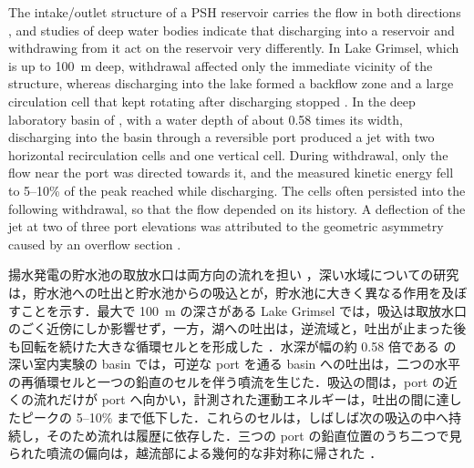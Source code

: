 \begin{en}[I-4]
The intake/outlet structure of a PSH reservoir carries the flow in both directions \citep{zhangParameterAnalysisPerformance2020,bermudezHydraulicModelStudy2017,mullerFlowFieldReservoir2018}, and studies of deep water bodies indicate that discharging into a reservoir and withdrawing from it act on the reservoir very differently. In Lake Grimsel, which is up to 100~m deep, withdrawal affected only the immediate vicinity of the structure, whereas discharging into the lake formed a backflow zone and a large circulation cell that kept rotating after discharging stopped \citep{mullerFlowFieldReservoir2018}. In the deep laboratory basin of \citet{mullerInfluenceOutflowSequences2012}, with a water depth of about 0.58 times its width, discharging into the basin through a reversible port produced a jet with two horizontal recirculation cells and one vertical cell. During withdrawal, only the flow near the port was directed towards it, and the measured kinetic energy fell to 5--10\% of the peak reached while discharging. The cells often persisted into the following withdrawal, so that the flow depended on its history. A deflection of the jet at two of three port elevations was attributed to the geometric asymmetry caused by an overflow section \citep{mullerInfluenceOutflowSequences2012}.
\end{en}
\begin{ja}
揚水発電の貯水池の取放水口は両方向の流れを担い \citep{zhangParameterAnalysisPerformance2020,bermudezHydraulicModelStudy2017,mullerFlowFieldReservoir2018}，深い水域についての研究は，貯水池への吐出と貯水池からの吸込とが，貯水池に大きく異なる作用を及ぼすことを示す．最大で 100~m の深さがある Lake Grimsel では，吸込は取放水口のごく近傍にしか影響せず，一方，湖への吐出は，逆流域と，吐出が止まった後も回転を続けた大きな循環セルとを形成した \citep{mullerFlowFieldReservoir2018}．水深が幅の約 0.58 倍である \citet{mullerInfluenceOutflowSequences2012} の深い室内実験の basin では，可逆な port を通る basin への吐出は，二つの水平の再循環セルと一つの鉛直のセルを伴う噴流を生じた．吸込の間は，port の近くの流れだけが port へ向かい，計測された運動エネルギーは，吐出の間に達したピークの 5--10\% まで低下した．これらのセルは，しばしば次の吸込の中へ持続し，そのため流れは履歴に依存した．三つの port の鉛直位置のうち二つで見られた噴流の偏向は，越流部による幾何的な非対称に帰された \citep{mullerInfluenceOutflowSequences2012}．
\end{ja}

